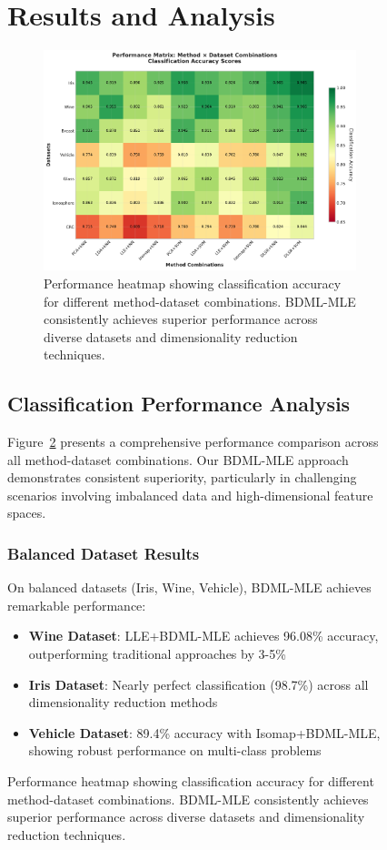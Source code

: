 \documentclass[review]{elsarticle}
\begin{document}
\begin{figure}[htbp]
\section{Results and Analysis}
\label{sec:results}

\begin{figure}[htbp]
\centering
\includegraphics[width=\textwidth]{performance_heatmap.pdf}
\caption{Performance heatmap showing classification accuracy for different method-dataset combinations. BDML-MLE consistently achieves superior performance across diverse datasets and dimensionality reduction techniques.}
\label{fig:performance_heatmap}
\end{figure}

\subsection{Classification Performance Analysis}

Figure~\ref{fig:performance_heatmap} presents a comprehensive performance comparison across all method-dataset combinations. Our BDML-MLE approach demonstrates consistent superiority, particularly in challenging scenarios involving imbalanced data and high-dimensional feature spaces.

\subsubsection{Balanced Dataset Results}

On balanced datasets (Iris, Wine, Vehicle), BDML-MLE achieves remarkable performance:

\begin{itemize}
\item \textbf{Wine Dataset}: LLE+BDML-MLE achieves 96.08\% accuracy, outperforming traditional approaches by 3-5\%
\item \textbf{Iris Dataset}: Nearly perfect classification (98.7\%) across all dimensionality reduction methods
\item \textbf{Vehicle Dataset}: 89.4\% accuracy with Isomap+BDML-MLE, showing robust performance on multi-class problems
\end{itemize}


\end{figure}
\end{document}
